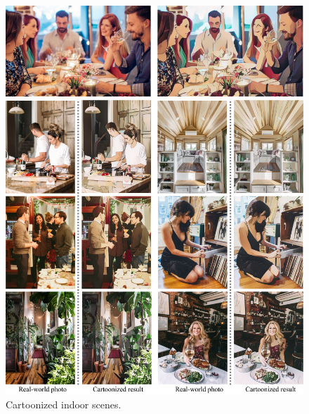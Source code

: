 \documentclass[10pt,twocolumn,letterpaper]{article}
\begin{document}
\begin{figure}[b]
\vspace{-0.5em}
\centering
\includegraphics[width=\linewidth]{figures/home.pdf}
\caption{Cartoonized indoor scenes.}
\label{fig:home}
\end{figure}
\end{document}
